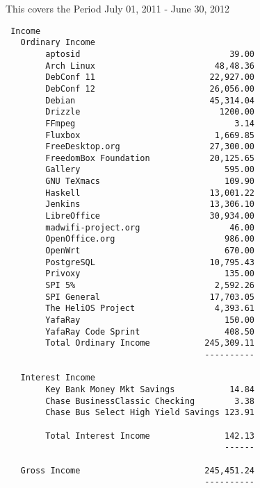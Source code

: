 \documentclass[letterpaper]{report}
\begin{document}
This covers the Period July 01, 2011 - June 30, 2012

\begin{verbatim}
 Income
   Ordinary Income
        aptosid                              39.00
        Arch Linux                        48,48.36
        DebConf 11                       22,927.00
        DebConf 12                       26,056.00
        Debian                           45,314.04
        Drizzle                            1200.00
        FFmpeg                                3.14
        Fluxbox                           1,669.85
        FreeDesktop.org                  27,300.00
        FreedomBox Foundation            20,125.65
        Gallery                             595.00
        GNU TeXmacs                         109.90
        Haskell                          13,001.22
        Jenkins                          13,306.10
        LibreOffice                      30,934.00
        madwifi-project.org                  46.00
        OpenOffice.org                      986.00
        OpenWrt                             670.00
        PostgreSQL                       10,795.43
        Privoxy                             135.00
        SPI 5%                            2,592.26
        SPI General                      17,703.05
        The HeliOS Project                4,393.61
        YafaRay                             150.00
        YafaRay Code Sprint                 408.50
        Total Ordinary Income           245,309.11
                                        ----------

   Interest Income
        Key Bank Money Mkt Savings           14.84
        Chase BusinessClassic Checking        3.38
        Chase Bus Select High Yield Savings 123.91

        Total Interest Income               142.13
                                            ------

   Gross Income                         245,451.24
                                        ----------


\end{verbatim}
\end{document}
